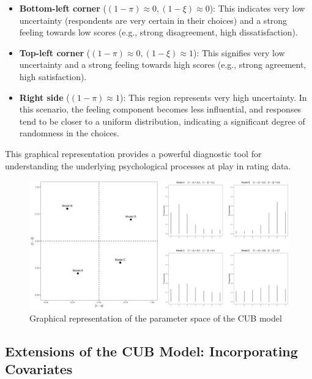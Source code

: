 \documentclass[
  letterpaper,
  DIV=11,
  numbers=noendperiod]{scrartcl}
\begin{document}
\begin{itemize}
\item
  \textbf{Bottom-left corner} (\((1−\pi)\approx0,(1−\xi)\approx0\)):
  This indicates very low uncertainty (respondents are very certain in
  their choices) and a strong feeling towards low scores (e.g., strong
  disagreement, high dissatisfaction).
\item
  \textbf{Top-left corner} (\((1−\pi)\approx0,(1−\xi)\approx1\)): This
  signifies very low uncertainty and a strong feeling towards high
  scores (e.g., strong agreement, high satisfaction).
\item
  \textbf{Right side} (\((1−\pi)\approx1\)): This region represents very
  high uncertainty. In this scenario, the feeling component becomes less
  influential, and responses tend to be closer to a uniform
  distribution, indicating a significant degree of randomness in the
  choices.
\end{itemize}

This graphical representation provides a powerful diagnostic tool for
understanding the underlying psychological processes at play in rating
data.

\begin{figure}

{\centering \includegraphics[width=1\textwidth,height=\textheight]{images/cartesian_agg.jpg}

}

\caption{Graphical representation of the parameter space of the CUB
model}

\end{figure}

\hypertarget{extensions-of-the-cub-model-incorporating-covariates}{%
\subsection{Extensions of the CUB Model: Incorporating
Covariates}\label{extensions-of-the-cub-model-incorporating-covariates}}
\end{document}
